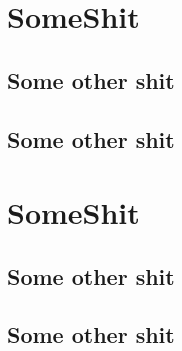 \documentclass[12pt compsoc]{article}
\begin{document}
\section{SomeShit}
\subsection{Some other shit}
\subsection{Some other shit}


\section{SomeShit}
\subsection{Some other shit}
\subsection{Some other shit}

\end{document}
